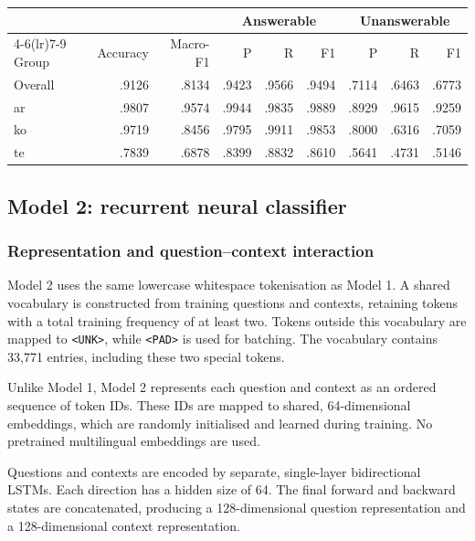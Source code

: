 \documentclass[11pt,a4paper]{article}
\begin{document}
\begin{center}
\small
\begin{tabular}{lrrrrrrrr}
\toprule
& & & \multicolumn{3}{c}{Answerable}
      & \multicolumn{3}{c}{Unanswerable} \\
\cmidrule(lr){4-6}\cmidrule(lr){7-9}
Group & Accuracy & Macro-F1 & P & R & F1 & P & R & F1 \\
\midrule
Overall & .9126 & .8134 & .9423 & .9566 & .9494
        & .7114 & .6463 & .6773 \\
ar      & .9807 & .9574 & .9944 & .9835 & .9889
        & .8929 & .9615 & .9259 \\
ko      & .9719 & .8456 & .9795 & .9911 & .9853
        & .8000 & .6316 & .7059 \\
te      & .7839 & .6878 & .8399 & .8832 & .8610
        & .5641 & .4731 & .5146 \\
\bottomrule
\end{tabular}
\end{center}


\subsection{Model 2: recurrent neural classifier}

\subsubsection{Representation and question--context interaction}

Model 2 uses the same lowercase whitespace tokenisation as Model 1.
A shared vocabulary is constructed from training questions and contexts,
retaining tokens with a total training frequency of at least two.
Tokens outside this vocabulary are mapped to \texttt{<UNK>}, while
\texttt{<PAD>} is used for batching. The vocabulary contains 33,771
entries, including these two special tokens.

Unlike Model 1, Model 2 represents each question and context as an
ordered sequence of token IDs. These IDs are mapped to shared,
64-dimensional embeddings, which are randomly initialised and learned
during training. No pretrained multilingual embeddings are used.

Questions and contexts are encoded by separate, single-layer
bidirectional LSTMs. Each direction has a hidden size of 64. The final
forward and backward states are concatenated, producing a
128-dimensional question representation and a 128-dimensional context
representation.
\end{document}

